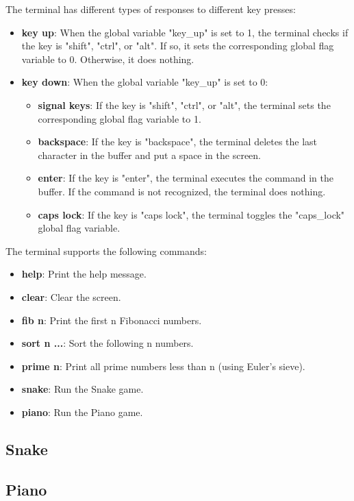 \documentclass[12pt, a4paper, oneside]{article}
\begin{document}
The terminal has different types of responses to different key presses:
\begin{itemize}
    \item \textbf{key up}: When the global variable "key\_up" is set to 1, the terminal checks if the key is "shift", "ctrl", or "alt". If so, it sets the corresponding global flag variable to 0. Otherwise, it does nothing.
    \item \textbf{key down}: When the global variable "key\_up" is set to 0:
          \begin{itemize}
              \item \textbf{signal keys}: If the key is "shift", "ctrl", or "alt", the terminal sets the corresponding global flag variable to 1.
              \item \textbf{backspace}: If the key is "backspace", the terminal deletes the last character in the buffer and put a space in the screen.
              \item \textbf{enter}: If the key is "enter", the terminal executes the command in the buffer. If the command is not recognized, the terminal does nothing.
              \item \textbf{caps lock}: If the key is "caps lock", the terminal toggles the "caps\_lock" global flag variable.
          \end{itemize}
\end{itemize}
The terminal supports the following commands:
\begin{itemize}
    \item \textbf{help}: Print the help message.
    \item \textbf{clear}: Clear the screen.
    \item \textbf{fib n}: Print the first n Fibonacci numbers.
    \item \textbf{sort n ...}: Sort the following n numbers.
    \item \textbf{prime n}: Print all prime numbers less than n (using Euler's sieve).
    \item \textbf{snake}: Run the Snake game.
    \item \textbf{piano}: Run the Piano game.
\end{itemize}
\subsection{Snake}

\subsection{Piano}
\end{document}
